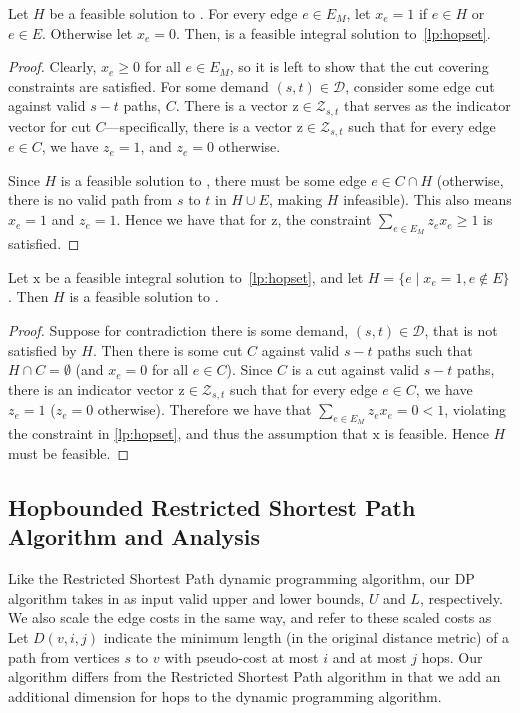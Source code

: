\begin{lemma}
    Let $H$ be a feasible solution to {\hopset}. For every edge $e \in E_M$, let $x_e = 1$ if $e \in H$ or $e \in E$. Otherwise let $x_e = 0$. Then,  is a feasible integral solution to~\ref{lp:hopset}.
\end{lemma}
\begin{proof}
    Clearly, $x_e \geq 0$ for all $e \in E_M$, so it is left to show that the cut covering constraints are satisfied. For some demand $(s,t) \in \mathcal{D}$, consider some edge cut against valid $s-t$ paths, $C$. There is a vector $\bm{\mathrm{z}} \in \mathcal{Z}_{s,t}$ that serves as the indicator vector for cut $C$---specifically, there is a vector $\bm{\mathrm{z}} \in \mathcal{Z}_{s,t}$ such that for every edge $e \in C$, we have $z_e = 1$, and $z_e = 0$ otherwise. 
    
    Since $H$ is a feasible solution to {\hopset}, there must be some edge $e \in C \cap H$ (otherwise, there is no valid path from $s$ to $t$ in $H \cup E$, making $H$ infeasible). This also means $x_e = 1$ and  $z_e = 1$. Hence we have that for $\bm{\mathrm{z}}$, the constraint $\sum_{e \in E_M} z_e x_e \geq 1$ is satisfied.
\end{proof}

\begin{lemma}
    Let $\bm{\mathrm{x}}$ be a feasible integral solution to~\ref{lp:hopset}, and let $H = \{ e \; | \; x_e = 1, e \notin E\}$. Then $H$ is a feasible solution to {\hopset}.
\end{lemma}
\begin{proof}
    Suppose for contradiction there is some demand, $(s,t) \in \mathcal{D}$, that is not satisfied by $H$.  Then there is some cut $C$ against valid $s-t$ paths such that $H \cap C = \emptyset$ (and $x_e = 0$ for all $e \in C$). Since $C$ is a cut against valid $s-t$ paths, there is an indicator vector $\bm{\mathrm{z}} \in \mathcal{Z}_{s,t}$ such that for every edge $e \in C$, we have $z_e = 1$ ($z_e = 0$ otherwise). Therefore we have that $\sum_{e \in E_M} z_e x_e = 0 < 1$, violating the constraint in \ref{lp:hopset}, and thus the assumption that $\bm{\mathrm{x}}$ is feasible. Hence $H$ must be feasible.
\end{proof}



\subsection{Hopbounded Restricted Shortest Path Algorithm and Analysis} \label{app:lp_alg}
Like the Restricted Shortest Path dynamic programming algorithm, our DP algorithm takes in as input valid upper and lower bounds, $U$ and $L$, respectively. We also scale the edge costs in the same way, and refer to these scaled costs as  Let $D(v, i, j)$ indicate the minimum length (in the original distance metric) of a path from vertices $s$ to $v$ with pseudo-cost at most $i$ and at most $j$ hops. Our algorithm differs from the Restricted Shortest Path algorithm in that we add an additional dimension for hops to the dynamic programming algorithm.

